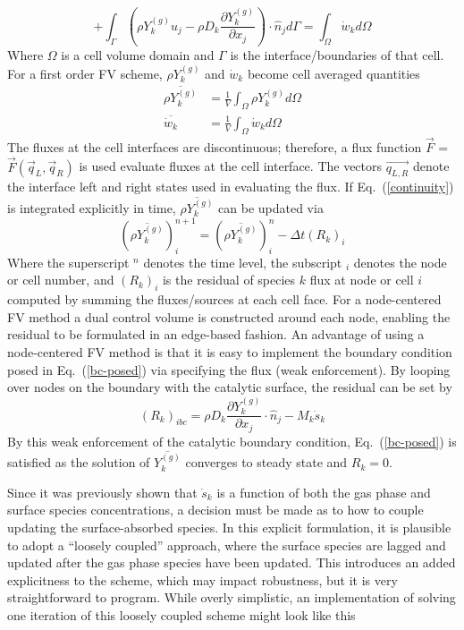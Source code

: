 \documentclass{report}
\newcommand{\eref}[1]{Eq.~(\ref{#1})}
\newcommand{\sk}{\dot{s}_k}
\newcommand{\wk}{\dot{w}_k}
\newcommand{\ry}{{\rho Y_{k}^{(g)}}}
\newcommand{\yk}{{Y_{k}^{(g)}}}
\newcommand{\dint}[1]{\int_{\Omega}{#1} d \Omega}
\newcommand{\fint}[1]{\int_{\Gamma}{#1} d \Gamma}
\newcommand{\flux}{\vec{F}}
\begin{document}
\begin{enumerate}[label=(\alph*)]
\begin{equation}
      + \fint{\left( \ry u_j - \rho D_k
        \frac{\partial Y_{k}^{(g)}}{\partial x_j}\right) \cdot \hat{n}_j }
      = \dint{\wk}
      \label{continuity}
    \end{equation}
    Where $\Omega$ is a cell volume domain and $\Gamma$ is the
    interface/boundaries of that cell.  For a first order FV scheme, $\ry$ and
    $\wk$ become cell averaged quantities
    \begin{align}
      \overline{\ry} &= \frac{1}{V}\dint{\ry} \\
      \overline{\wk} &= \frac{1}{V}\dint{\wk}
      \label{avg-q}
    \end{align}
    The fluxes at the cell interfaces are discontinuous; therefore, a flux function
    $\flux$ = $\flux (\vec{q}_L, \vec{q}_R)$ is used evaluate fluxes at the cell interface.
    The vectors $\vec{q_{L,R}}$ denote the interface left and right states used
    in evaluating the flux. If \eref{continuity} is integrated explicitly in
    time, $\overline{\ry}$ can be updated via
    \begin{equation}
      (\overline{\ry})_{i}^{n+1} = (\overline{\ry})^{n}_i - \Delta t (R_k)_i
      \label{expl-fv}
    \end{equation}
    Where the superscript $^n$ denotes the time level, the subscript $_i$
    denotes the node or cell number, and $(R_k)_i$ is the residual of species
    $k$ flux at node or cell $i$ computed by summing the fluxes/sources at each
    cell face.  For a node-centered FV method a dual control volume is
    constructed around each node, enabling the residual to be formulated in an
    edge-based fashion.  An advantage of using a node-centered FV method is that
    it is easy to implement the boundary condition posed in \eref{bc-posed} via
    specifying the flux (weak enforcement).  By looping over nodes on the
    boundary with the catalytic surface, the residual can be set by
    \begin{equation}
      (R_k)_{ibc} = \rho D_k \frac{\partial Y_k^{(g)}}{\partial x_j} \cdot \hat{n}_j
      - M_k \sk
      \label{res-bc}
    \end{equation}
    By this weak enforcement of the catalytic boundary condition,
    \eref{bc-posed} is satisfied as the solution of $\overline{\yk}$ converges
    to steady state and $R_k = 0$.

    Since it was previously shown that $\sk$ is a
    function of both the gas phase and surface species concentrations, a
    decision must be made as to how to couple updating the surface-absorbed
    species.  In this explicit formulation, it is plausible to adopt a ``loosely
    coupled'' approach, where the surface species are lagged and updated after
    the gas phase species have been updated.  This introduces an added
    explicitness to the scheme, which may impact robustness, but it is very
    straightforward to program.  While overly simplistic, an implementation of
    solving one iteration of this loosely coupled scheme might look like this
    \begin{lstlisting}[language=FORTRAN, caption=Loosely Coupled Implementation]


\end{lstlisting}
\end{enumerate}
\end{document}
